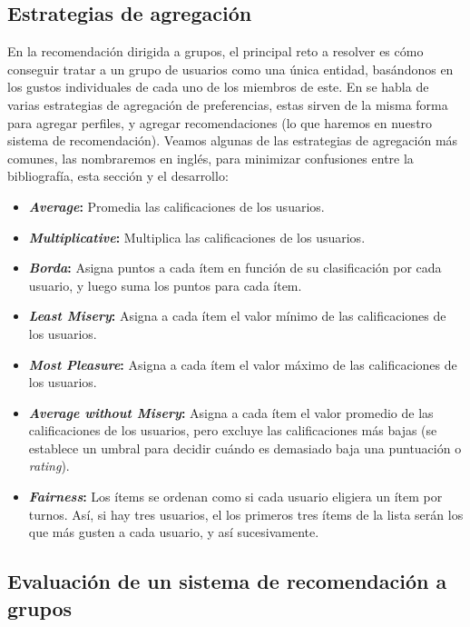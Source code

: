 \subsection{Estrategias de agregación\label{SEC:AGREGACION}}

En la recomendación dirigida a grupos, el principal reto a resolver es cómo conseguir tratar a un grupo de usuarios como una única entidad, basándonos
en los gustos individuales de cada uno de los miembros de este. En \cite{grouprecommender} se habla de varias estrategias de agregación de preferencias,
estas sirven de la misma forma para agregar perfiles, y agregar recomendaciones (lo que haremos en nuestro sistema de recomendación). 
Veamos algunas de las estrategias de agregación más comunes, las nombraremos en inglés, para minimizar confusiones entre 
la bibliografía, esta sección y el desarrollo:

\begin{itemize}
    \item \textbf{\textit{Average}:} Promedia las calificaciones de los usuarios.
    \item \textbf{\textit{Multiplicative}:} Multiplica las calificaciones de los usuarios. 
    \item \textbf{\textit{Borda}:} Asigna puntos a cada ítem en función de su clasificación por cada usuario, y luego suma los puntos 
    para cada ítem.
    \item \textbf{\textit{Least Misery}:} Asigna a cada ítem el valor mínimo de las calificaciones de los usuarios.
    \item \textbf{\textit{Most Pleasure}:} Asigna a cada ítem el valor máximo de las calificaciones de los usuarios.
    \item \textbf{\textit{Average without Misery}:} Asigna a cada ítem el valor promedio de las calificaciones de los usuarios, pero
    excluye las calificaciones más bajas (se establece un umbral para decidir cuándo es demasiado baja una puntuación o \textit{rating}).
    \item \textbf{\textit{Fairness}:} Los ítems se ordenan como si cada usuario eligiera un ítem por turnos. Así, si hay tres usuarios, el
    los primeros tres ítems de la lista serán los que más gusten a cada usuario, y así sucesivamente.
\end{itemize}


\subsection{Evaluación de un sistema de recomendación a grupos\label{SEC:EVALUACION}}

